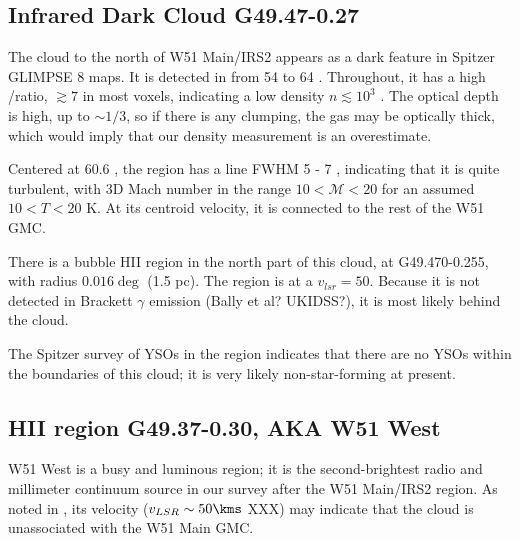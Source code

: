 \subsection{Infrared Dark Cloud G49.47-0.27}
The cloud to the north of W51 Main/IRS2 appears as a dark feature in Spitzer
GLIMPSE 8 \um maps.  It is detected in \formaldehyde from 54 to 64
\kms.  Throughout, it has a high \oneone/\twotwo ratio, $\gtrsim7$ in
most voxels, indicating a low density $n\lesssim10^3$ \percc.  The \oneone
optical depth is high, up to $\sim1/3$, so if there is any clumping, the gas
may be optically thick, which would imply that our density measurement is an
overestimate.

Centered at 60.6 \kms, the region has a line FWHM 5 - 7 \kms, indicating that
it is quite turbulent, with 3D Mach number in the range $10 < \mathcal{M} < 20$
for an assumed $10 < T < 20$ K.  At its centroid velocity, it is connected
to the rest of the W51 GMC.

There is a bubble HII region in the north part of this cloud, at G49.470-0.255,
with radius $0.016\deg$ (1.5 pc).  The \hii region is at a $v_{lsr}=50$\kms.
Because it is not detected in Brackett $\gamma$ emission (Bally et al?
UKIDSS?), it is most likely behind the cloud.

The \citet{Kang2009a} Spitzer survey of YSOs in the region indicates that there
are no YSOs within the boundaries of this cloud; it is very likely
non-star-forming at present.

\subsection{HII region G49.37-0.30, AKA W51 West}
W51 West is a busy and luminous \hii region; it is the second-brightest radio
and millimeter continuum source in our survey after the W51 Main/IRS2 region.
As noted in \citet{Carpenter1998a}, its velocity ($v_{LSR}\sim 50\kms$ XXX) 
may indicate that the cloud is unassociated with the W51 Main GMC.



